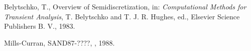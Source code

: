 \begin{thebibliography}{99}
\frenchspacing

 Belytschko, T., Overview of Semidiscretization, in: {\it
Computational Methods for Transient Analysis}, T. Belytschko and T. J.
R. Hughes, ed., Elsevier Science Publishers B. V., 1983.

 Mills-Curran, SAND87-????, \SANDIA, 1988.
\end{thebibliography}
